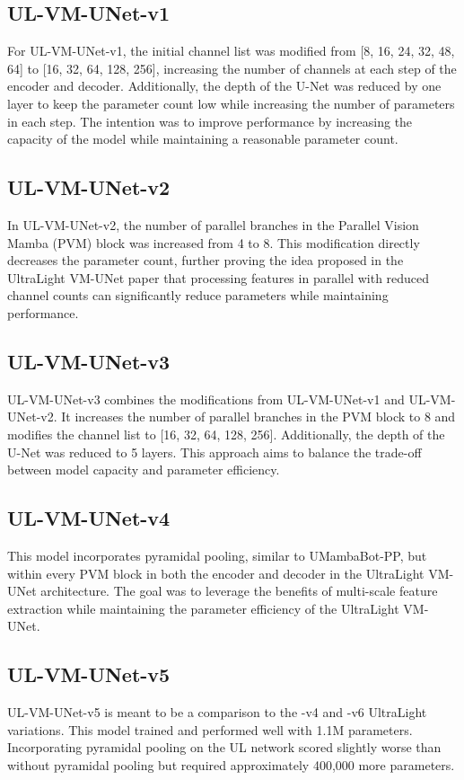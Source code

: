 \documentclass[conference]{IEEEtran}
\begin{document}

\subsection{UL-VM-UNet-v1}
For UL-VM-UNet-v1, the initial channel list was modified from [8, 16, 24, 32, 48, 64] to [16, 32, 64, 128, 256], increasing the number of channels at each step of the encoder and decoder. Additionally, the depth of the U-Net was reduced by one layer to keep the parameter count low while increasing the number of parameters in each step. The intention was to improve performance by increasing the capacity of the model while maintaining a reasonable parameter count.

\subsection{UL-VM-UNet-v2}
In UL-VM-UNet-v2, the number of parallel branches in the Parallel Vision Mamba (PVM) block was increased from 4 to 8. This modification directly decreases the parameter count, further proving the idea proposed in the UltraLight VM-UNet paper \cite{wu2024ultralight} that processing features in parallel with reduced channel counts can significantly reduce parameters while maintaining performance.

\subsection{UL-VM-UNet-v3}
UL-VM-UNet-v3 combines the modifications from UL-VM-UNet-v1 and UL-VM-UNet-v2. It increases the number of parallel branches in the PVM block to 8 and modifies the channel list to [16, 32, 64, 128, 256]. Additionally, the depth of the U-Net was reduced to 5 layers. This approach aims to balance the trade-off between model capacity and parameter efficiency.

\subsection{UL-VM-UNet-v4}
This model incorporates pyramidal pooling, similar to UMambaBot-PP, but within every PVM block in both the encoder and decoder in the UltraLight VM-UNet architecture. The goal was to leverage the benefits of multi-scale feature extraction while maintaining the parameter efficiency of the UltraLight VM-UNet.

\subsection{UL-VM-UNet-v5}
UL-VM-UNet-v5 is meant to be a comparison to the -v4 and -v6 UltraLight variations. This model trained and performed well with 1.1M parameters. Incorporating pyramidal pooling on the UL network scored slightly worse than without pyramidal pooling but required approximately 400,000 more parameters. 
\end{document}
